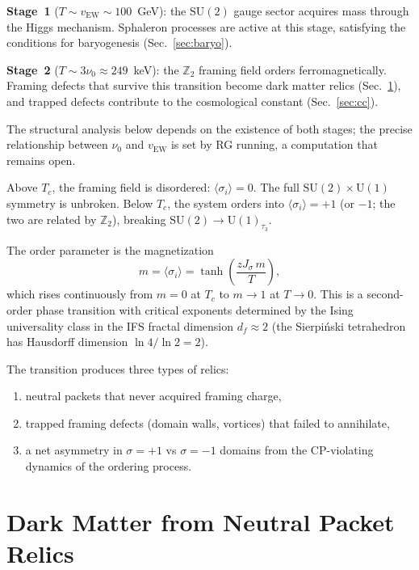 \documentclass[11pt,twocolumn]{article}
\begin{document}
\textbf{Stage~1} ($T\sim v_{\mathrm{EW}}\sim 100$~GeV): the $\mathrm{SU}(2)$ gauge sector acquires mass through the Higgs mechanism.
Sphaleron processes are active at this stage, satisfying the conditions for baryogenesis (Sec.~\ref{sec:baryo}).

\textbf{Stage~2} ($T\sim 3\nu_0\approx 249$~keV): the $\mathbb{Z}_2$ framing field orders ferromagnetically.
Framing defects that survive this transition become dark matter relics (Sec.~\ref{sec:dm}), and trapped defects contribute to the cosmological constant (Sec.~\ref{sec:cc}).

The structural analysis below depends on the existence of both stages; the precise relationship between $\nu_0$ and $v_{\mathrm{EW}}$ is set by RG running, a computation that remains open.

Above $T_c$, the framing field is disordered: $\langle\sigma_i\rangle=0$.
The full $\mathrm{SU}(2)\times\mathrm{U}(1)$ symmetry is unbroken.
Below $T_c$, the system orders into $\langle\sigma_i\rangle=+1$ (or $-1$; the two are related by $\mathbb{Z}_2$), breaking $\mathrm{SU}(2)\to\mathrm{U}(1)_{\tau_3}$.

The order parameter is the magnetization
\begin{equation}
m = \langle\sigma_i\rangle = \tanh\!\left(\frac{zJ_\sigma\,m}{T}\right),
\label{eq:magnetization}
\end{equation}
which rises continuously from $m=0$ at $T_c$ to $m\to 1$ at $T\to 0$.
This is a second-order phase transition with critical exponents determined by the Ising universality class in the IFS fractal dimension $d_f\approx 2$ (the Sierpi\'nski tetrahedron has Hausdorff dimension $\ln 4/\ln 2=2$).

The transition produces three types of relics:
\begin{enumerate}[label=(\roman*),leftmargin=2em,itemsep=2pt]
\item neutral packets that never acquired framing charge,
\item trapped framing defects (domain walls, vortices) that failed to annihilate,
\item a net asymmetry in $\sigma=+1$ vs $\sigma=-1$ domains from the CP-violating dynamics of the ordering process.
\end{enumerate}

\section{Dark Matter from Neutral Packet Relics}
\label{sec:dm}
\end{document}
